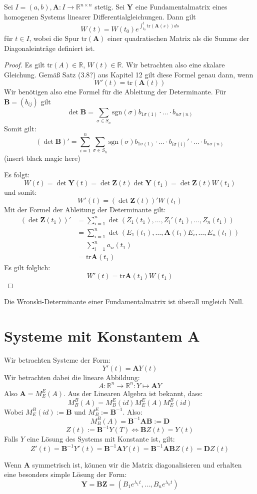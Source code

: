 \documentclass{report}
\newcommand*{\newpar}{\par\vspace{\baselineskip}\noindent}
\newcommand{\bR}{\mathbb{R}}
\newcommand{\tbA}{\mathbf{A}}
\newcommand{\tbB}{\mathbf{B}}
\newcommand{\tbD}{\mathbf{D}}
\newcommand{\tbY}{\mathbf{Y}}
\newcommand{\tbZ}{\mathbf{Z}}
\renewcommand{\tr}{\text{tr}}
\begin{document}
\begin{theorem}
	Sei $I = (a,b), \tbA : I \to \bR^{n \times n}$ stetig. Sei $\tbY$ eine Fundamentalmatrix eines homogenen Systems linearer Differentialgleichungen. Dann gilt
	\[W(t) = W(t_0) e^{\int_{t_0}^t \tr(\tbA(s)) ds}\]
	für $t \in I$, wobei die Spur $\tr(\tbA)$ einer quadratischen Matrix als die Summe der Diagonaleinträge definiert ist.
\end{theorem}
\begin{proof}
	Es gilt $\tr(A) \in \bR$, $W(t) \in \bR$. Wir betrachten also eine skalare Gleichung. Gemäß Satz (3.8?) aus Kapitel 12 gilt diese Formel genau dann, wenn
	\[W'(t) = \tr(\tbA(t))\]
	Wir benötigen also eine Formel für die Ableitung der Determinante. Für $\tbB = (b_{ij})$ gilt
	\[\det \tbB = \sum_{\sigma \in S_n} \text{sgn}(\sigma) b_{1\sigma(1)} \cdot \hdots \cdot b_{n\sigma(n)}\]
	Somit gilt:
	\[(\det \tbB)' = \sum_{i=1}^n \sum_{\sigma \in S_n} \text{sgn}(\sigma) b_{1\sigma(1)} \cdot \hdots \cdot b_{i \sigma(i)}' \cdot \hdots \cdot b_{n\sigma(n)}\]
	(insert black magic here)
	\newpar
	Es folgt:
	\[W(t) = \det \tbY(t) = \det \tbZ(t) \det \tbY(t_1) = \det \tbZ(t) W(t_1)\]
	und somit:
	\[W'(t) = (\det \tbZ(t))' W(t_1)\]
	Mit der Formel der Ableitung der Determinante gilt:
	\begin{align*}
		(\det \tbZ(t_1))' &= \sum_{i = 1}^n \det (Z_1(t_1), \hdots, Z_i'(t_1), \hdots, Z_n(t_1))\\
						  &= \sum_{i = 1}^n \det (E_1(t_1), \hdots, \tbA(t_1)E_i, \hdots, E_n(t_1))\\
						  &= \sum_{i = 1}^n a_{ii}(t_1)\\
						  &= \tr \tbA(t_1)
	\end{align*}
	Es gilt folglich:
	\[W'(t) = \tr \tbA(t_1)W(t_1)\]
\end{proof}
\begin{corollary}
	Die Wronski-Determinante einer Fundamentalmatrix ist überall ungleich Null.
\end{corollary}
\section{Systeme mit Konstantem A}
Wir betrachten Systeme der Form:
\[Y'(t) = \tbA Y(t)\]
Wir betrachten dabei die lineare Abbildung:
\[A : \bR^n \to \bR^n : Y \mapsto \tbA Y\]
Also $\tbA = M_{E}^{E}(A)$. Aus der Linearen Algebra ist bekannt, dass:
\[M^{B}_B(A) = M_B^E(id) M_E^E(A) M_E^B(id)\]
Wobei $M_E^B(id) := \tbB$ und $M_B^E := \tbB^{-1}$. Also:
\[M_B^B(A) = \tbB^{-1} \tbA \tbB := \tbD\]
\[Z(t) := \tbB^{-1}Y(T) \Leftrightarrow \tbB Z(t) = Y(t)\]
Falls $Y$ eine Lösung des Systems mit Konstante ist, gilt:
\[Z'(t) = \tbB^{-1}Y'(t) = \tbB^{-1}\tbA Y(t) = \tbB^{-1}\tbA\tbB Z(t) = \tbD Z(t)\]
\begin{theorem}
	Wenn $\tbA$ symmetrisch ist, können wir die Matrix diagonalisieren und erhalten eine besonders simple Lösung der Form:
	\[\tbY = \tbB \tbZ = (B_1 e^{\lambda_1 t}, \hdots, B_n e^{\lambda_n t})\]
\end{theorem}
%
%
%
%
%
%
%
%
%
%
\end{document}
